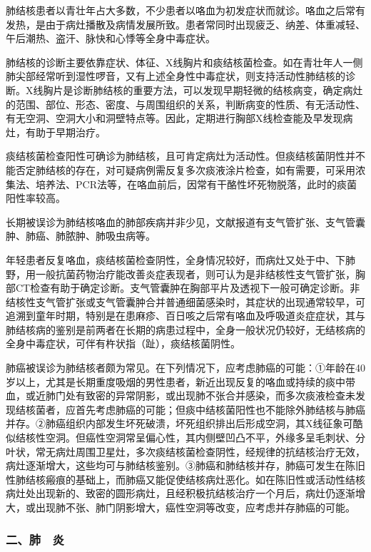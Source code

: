 肺结核患者以青壮年占大多数，不少患者以咯血为初发症状而就诊。咯血之后常有发热，是由于病灶播散及病情发展所致。患者常同时出现疲乏、纳差、体重减轻、午后潮热、盗汗、脉快和心悸等全身中毒症状。

肺结核的诊断主要依靠症状、体征、X线胸片和痰结核菌检查。如在青壮年人一侧肺尖部经常听到湿性啰音，又有上述全身性中毒症状，则支持活动性肺结核的诊断。X线胸片是诊断肺结核的重要方法，可以发现早期轻微的结核病变，确定病灶的范围、部位、形态、密度、与周围组织的关系，判断病变的性质、有无活动性、有无空洞、空洞大小和洞壁特点等。因此，定期进行胸部X线检查能及早发现病灶，有助于早期治疗。

痰结核菌检查阳性可确诊为肺结核，且可肯定病灶为活动性。但痰结核菌阴性并不能否定肺结核的存在，对可疑病例需反复多次痰液涂片检查，如有需要，可采用浓集法、培养法、PCR法等，在咯血前后，因常有干酪性坏死物脱落，此时的痰菌阳性率较高。

长期被误诊为肺结核咯血的肺部疾病并非少见，文献报道有支气管扩张、支气管囊肿、肺癌、肺脓肿、肺吸虫病等。

年轻患者反复咯血，痰结核菌检查阴性，全身情况较好，而病灶又处于中、下肺野，用一般抗菌药物治疗能改善炎症表现者，则可认为是非结核性支气管扩张，胸部CT检查有助于确定诊断。支气管囊肿在胸部平片及透视下一般可确定诊断。非结核性支气管扩张或支气管囊肿合并普通细菌感染时，其症状的出现通常较早，可追溯到童年时期，特别是在患麻疹、百日咳之后常有咯血及呼吸道炎症症状，其与肺结核病的鉴别是前两者在长期的病患过程中，全身一般状况仍较好，无结核病的全身中毒症状，可伴有杵状指（趾），痰结核菌阴性。

肺癌被误诊为肺结核者颇为常见。在下列情况下，应考虑肺癌的可能：①年龄在40岁以上，尤其是长期重度吸烟的男性患者，新近出现反复的咯血或持续的痰中带血，或近肺门处有致密的异常阴影，或出现肺不张合并感染，而多次痰液检查未发现结核菌者，应首先考虑肺癌的可能；但痰中结核菌阳性也不能除外肺结核与肺癌并存。②肺癌组织内部发生坏死破溃，坏死组织排出后形成空洞，其X线征象可酷似结核性空洞。但癌性空洞常呈偏心性，其内侧壁凹凸不平，外缘多呈毛刺状、分叶状，常无病灶周围卫星灶，多次痰结核菌检查阴性，经规律的抗结核治疗无效，病灶逐渐增大，这些均可与肺结核鉴别。③肺癌和肺结核并存，肺癌可发生在陈旧性肺结核瘢痕的基础上，而肺癌又能促使结核病灶恶化。如在陈旧性或活动性结核病灶处出现新的、致密的圆形病灶，且经积极抗结核治疗一个月后，病灶仍逐渐增大，或出现肺不张、肺门阴影增大，癌性空洞等改变，应考虑并存肺癌的可能。

\subsubsection{二、肺　炎}

